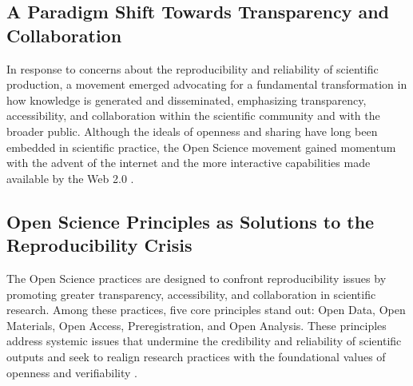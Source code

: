 \documentclass[final]{rc-book-2.14}
\begin{document}
\subsection{A Paradigm Shift Towards Transparency and Collaboration}

In response to concerns about the reproducibility and reliability of scientific production, a movement emerged advocating for a fundamental transformation in how knowledge is generated and disseminated, emphasizing transparency, accessibility, and collaboration within the scientific community and with the broader public. Although the ideals of openness and sharing have long been embedded in scientific practice, the Open Science movement gained momentum with the advent of the internet and the more interactive capabilities made available by the Web 2.0 \cite{thibault_open_2023}.

\subsection{Open Science Principles as Solutions to the Reproducibility Crisis}

The Open Science practices are designed to confront reproducibility issues by promoting greater transparency, accessibility, and collaboration in scientific research. Among these practices, five core principles stand out: Open Data, Open Materials, Open Access, Preregistration, and Open Analysis. These principles address systemic issues that undermine the credibility and reliability of scientific outputs and seek to realign research practices with the foundational values of openness and verifiability \cite{van_dijk_open_2021}.
\end{document}
